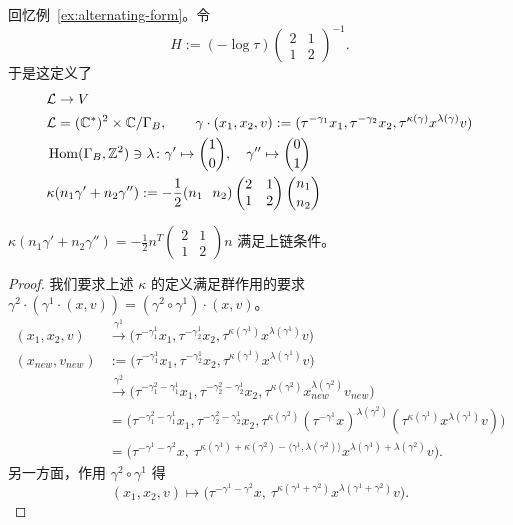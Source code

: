 \begin{example}\label{ex:H-choice}
回忆例~\ref{ex:alternating-form}。令
\[
H := (-\log\tau)\begin{pmatrix}2&1\\1&2\end{pmatrix}^{-1}.
\]
于是这定义了
\begin{align*}
&\mathcal{L}\to V\\
&\mathcal{L}=(\mathbb{C}^*)^2\times\mathbb{C}/\Gamma_B,\qquad
\gamma\cdot(x_1,x_2,v) := (\tau^{-\gamma_1}x_1,\tau^{-\gamma_2}x_2,
\tau^{\kappa(\gamma)}x^{\lambda(\gamma)}v)\\
&\operatorname{Hom}(\Gamma_B,\mathbb{Z}^2)\ni\lambda\colon
\gamma'\mapsto\binom{1}{0},\quad \gamma''\mapsto\binom{0}{1}\\
&\kappa(n_1\gamma'+n_2\gamma'') := -\frac{1}{2}
(n_1\ \ n_2)\begin{pmatrix}2&1\\1&2\end{pmatrix}\binom{n_1}{n_2}
\end{align*}
\end{example}

\begin{claim}\label{claim:kappa-cocycle}
$\kappa(n_1\gamma'+n_2\gamma'')=-\frac{1}{2}n^T
\begin{pmatrix}2&1\\1&2\end{pmatrix}n$ 满足上链条件。
\end{claim}

\begin{proof}
我们要求上述 $\kappa$ 的定义满足群作用的要求
$\gamma^2\cdot(\gamma^1\cdot(x,v))=(\gamma^2\circ\gamma^1)\cdot(x,v)$。
\begin{align*}
(x_1,x_2,v)&\xrightarrow{\gamma^1}
\bigl(\tau^{-\gamma^1_1}x_1,\tau^{-\gamma^1_2}x_2,
\tau^{\kappa(\gamma^1)}x^{\lambda(\gamma^1)}v\bigr)\\
(x_{new},v_{new}) &:= \bigl(\tau^{-\gamma^1_1}x_1,\tau^{-\gamma^1_2}x_2,
\tau^{\kappa(\gamma^1)}x^{\lambda(\gamma^1)}v\bigr)\\
&\xrightarrow{\gamma^2}
\bigl(\tau^{-\gamma^2_1-\gamma^1_1}x_1,\tau^{-\gamma^2_2-\gamma^1_2}x_2,
\tau^{\kappa(\gamma^2)}x_{new}^{\lambda(\gamma^2)}v_{new}\bigr)\\
&=\bigl(\tau^{-\gamma^2_1-\gamma^1_1}x_1,\tau^{-\gamma^2_2-\gamma^1_2}x_2,
\tau^{\kappa(\gamma^2)}(\tau^{-\gamma^1}x)^{\lambda(\gamma^2)}
(\tau^{\kappa(\gamma^1)}x^{\lambda(\gamma^1)}v)\bigr)\\
&=\bigl(\tau^{-\gamma^1-\gamma^2}x,\ 
\tau^{\kappa(\gamma^1)+\kappa(\gamma^2)-\langle\gamma^1,\lambda(\gamma^2)\rangle}
x^{\lambda(\gamma^1)+\lambda(\gamma^2)}v\bigr).
\end{align*}
另一方面，作用 $\gamma^2\circ\gamma^1$ 得
\[
(x_1,x_2,v)\mapsto
\bigl(\tau^{-\gamma^1-\gamma^2}x,\
\tau^{\kappa(\gamma^1+\gamma^2)}x^{\lambda(\gamma^1+\gamma^2)}v\bigr).
\]
\end{proof}

